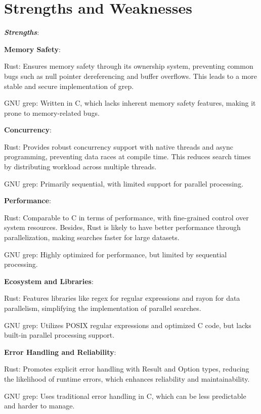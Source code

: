 \documentclass[letterpaper,twocolumn,10pt]{article}
\begin{document}
\section{Strengths and Weaknesses}

{\it{\textbf{Strengths}}}:

\noindent \textbf{Memory Safety}:

Rust: Ensures memory safety through its ownership system, preventing common bugs such as null pointer dereferencing and buffer overflows. This leads to a more stable and secure implementation of grep.

GNU grep: Written in C, which lacks inherent memory safety features, making it prone to memory-related bugs.

\noindent \textbf{Concurrency}:

Rust: Provides robust concurrency support with native threads and async programming, preventing data races at compile time. This reduces search times by distributing workload across multiple threads.

GNU grep: Primarily sequential, with limited support for parallel processing.

\noindent \textbf{Performance}:

Rust: Comparable to C in terms of performance, with fine-grained control over system resources. Besides, Rust is likely to have better performance through parallelization, making searches faster for large datasets.

GNU grep: Highly optimized for performance, but limited by sequential processing.

\noindent \textbf{Ecosystem and Libraries}:

Rust: Features libraries like regex for regular expressions and rayon for data parallelism, simplifying the implementation of parallel searches.

GNU grep: Utilizes POSIX regular expressions and optimized C code, but lacks built-in parallel processing support.

\noindent \textbf{Error Handling and Reliability}:

Rust: Promotes explicit error handling with Result and Option types, reducing the likelihood of runtime errors, which enhances reliability and maintainability.

GNU grep: Uses traditional error handling in C, which can be less predictable and harder to manage.\\
\end{document}
